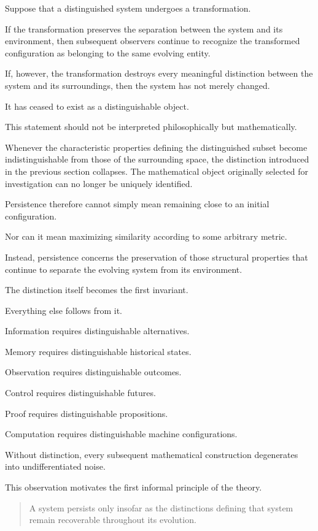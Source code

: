 \documentclass[11pt]{book}
\numberwithin{equation}{chapter}
\theoremstyle{definition}
\theoremstyle{plain}
\begin{document}
Suppose that a distinguished system undergoes a transformation.

If the transformation preserves the separation between the system and its environment, then subsequent observers continue to recognize the transformed configuration as belonging to the same evolving entity.

If, however, the transformation destroys every meaningful distinction between the system and its surroundings, then the system has not merely changed.

It has ceased to exist as a distinguishable object.

This statement should not be interpreted philosophically but mathematically.

Whenever the characteristic properties defining the distinguished subset become indistinguishable from those of the surrounding space, the distinction introduced in the previous section collapses. The mathematical object originally selected for investigation can no longer be uniquely identified.

Persistence therefore cannot simply mean remaining close to an initial configuration.

Nor can it mean maximizing similarity according to some arbitrary metric.

Instead, persistence concerns the preservation of those structural properties that continue to separate the evolving system from its environment.

The distinction itself becomes the first invariant.

Everything else follows from it.

Information requires distinguishable alternatives.

Memory requires distinguishable historical states.

Observation requires distinguishable outcomes.

Control requires distinguishable futures.

Proof requires distinguishable propositions.

Computation requires distinguishable machine configurations.

Without distinction, every subsequent mathematical construction degenerates into undifferentiated noise.

This observation motivates the first informal principle of the theory.

\begin{quote}
A system persists only insofar as the distinctions defining that system remain recoverable throughout its evolution.
\end{quote}
\end{document}
